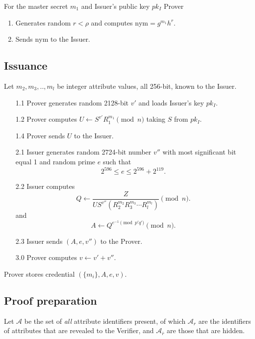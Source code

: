 \documentclass[a4paper]{article}
\begin{document}
For the master secret $m_1$ and Issuer's public key $pk_I$ Prover 
\begin{enumerate}
\item Generates random $r<\rho$ and computes
$\mathrm{nym} = g^{m_1}h^{r}$.
\item Sends $\mathrm{nym}$ to the Issuer.
\end{enumerate}


\subsection{Issuance}
Let $m_2,m_3,..,m_l$ be integer attribute values, all 256-bit, known to the Issuer. 
\begin{enumerate}
\item [1.1] Prover generates random 2128-bit $v'$ and loads Issuer's key $pk_I$.
\item [1.2] Prover computes $
U \leftarrow S^{v'}R_1^{m_1}\pmod{n}$ taking $S$ from $pk_I$.
\item [1.4] Prover sends $U$ to the Issuer.
\item [2.1] Issuer generates  random 2724-bit number $v''$ with most significant bit equal 1 and random prime  $e$ such that
$$
2^{596}\leq e \leq 2^{596}+ 2^{119}.
$$
\item [2.2] Issuer computes 
$$
Q \leftarrow \frac{Z}{U S^{v''}(R_2^{m_2}R_3^{m_3}\cdots  R_l^{m_l})}\pmod{n}.
$$
and
$$
A \leftarrow Q^{e^{-1}\pmod{p'q'}}\pmod{n}.
$$
\item [2.3] Issuer sends $(A,e,v'')$ to the Prover.
\item [3.0] Prover computes $v \leftarrow v'+v''$.
\end{enumerate}
Prover stores credential $(\{m_i\},A,e,v)$.

\subsection{Proof preparation}
Let $\mathcal{A}$ be the set of \emph{all} attribute identifiers present, of which  $\mathcal{A}_r$ are the identifiers of attributes  that are revealed to the Verifier, and $\mathcal{A}_{\overline{r}}$ are those that are hidden.
\end{document}
